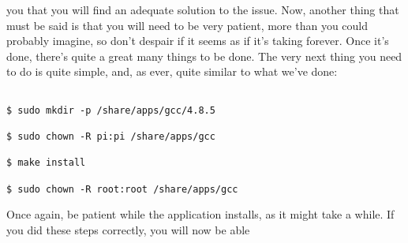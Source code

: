 \documentclass[]{article}
\begin{document}
                                                                                                                                                                                                                       you that you will find an adequate solution to the issue. Now, another thing that must be said is that you will need to be very patient,
                                                                                                                                                                                                                       more than you could probably imagine, so don't despair if it seems as if it's taking forever. Once it's done, there's quite a great
                                                                                                                                                                                                                       many things to be done. The very next thing you need to do is quite simple, and, as ever, quite similar to what we've done:
                                                                                                                                                                                                                       \begin{lstlisting}
                                                                                                                                                                                                                       $ sudo mkdir -p /share/apps/gcc/4.8.5
                                                                                                                                                                                                                       $ sudo chown -R pi:pi /share/apps/gcc
                                                                                                                                                                                                                       $ make install
                                                                                                                                                                                                                       $ sudo chown -R root:root /share/apps/gcc
                                                                                                                                                                                                                       \end{lstlisting}
                                                                                                                                                                                                                       Once again, be patient while the application installs, as it might take a while. If you did these steps correctly, you will now be able
\end{document}
